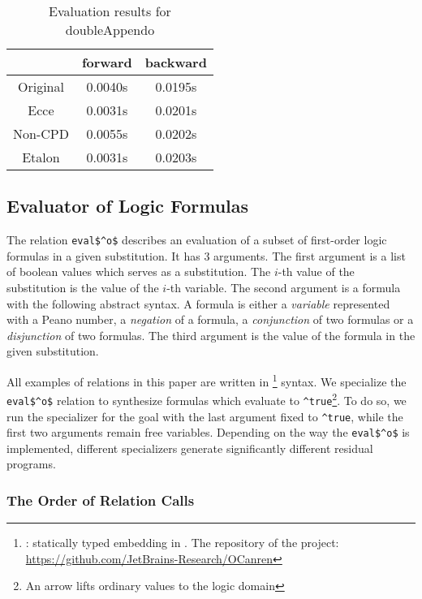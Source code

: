 \begin{table}
  \centering
  \begin{tabular}{c||c||c}
                   & forward & backward \\
  \hline\hline
  Original         & 0.0040s & 0.0195s \\ \hline
  Ecce             & 0.0031s & 0.0201s \\ \hline
  Non-CPD          & 0.0055s & 0.0202s \\ \hline
  Etalon           & 0.0031s & 0.0203s \\
  \end{tabular}
  \caption{Evaluation results for doubleAppendo}
  \label{tbl:doubleApp}
\end{table}


\subsection{Evaluator of Logic Formulas}

The relation \lstinline{eval$^o$} describes an evaluation of a subset of first-order logic formulas in a given substitution.
It has 3 arguments.
The first argument is a list of boolean values which serves as a substitution.
The $i$-th value of the substitution is the value of the $i$-th variable.
The second argument is a formula with the following abstract syntax.
A formula is either a \emph{variable} represented with a Peano number, a \emph{negation} of a formula, a \emph{conjunction} of two formulas or a \emph{disjunction} of two formulas.
The third argument is the value of the formula in the given substitution.

All examples of \mk{} relations in this paper are written in \oc{}\footnote{\oc{}: statically typed \mk{} embedding in \ocaml{}. The repository of the project: \url{https://github.com/JetBrains-Research/OCanren}} syntax.
We specialize the \lstinline{eval$^o$} relation to synthesize formulas which evaluate to \lstinline{^true}\footnote{An arrow lifts ordinary values to the logic domain}.
To do so, we run the specializer for the goal with the last argument fixed to \lstinline{^true}, while the first two arguments remain free variables.
Depending on the way the \lstinline{eval$^o$} is implemented, different specializers generate significantly different residual programs.

\subsubsection{The Order of Relation Calls}

